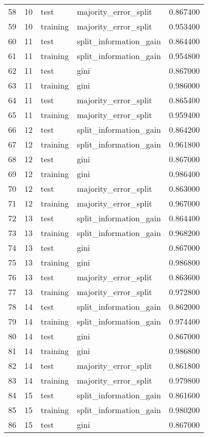 \begin{tabular}{lrllr}
58 & 10 & test & majority_error_split & 0.867400 \\
59 & 10 & training & majority_error_split & 0.953400 \\
60 & 11 & test & split_information_gain & 0.864400 \\
61 & 11 & training & split_information_gain & 0.954800 \\
62 & 11 & test & gini & 0.867000 \\
63 & 11 & training & gini & 0.986000 \\
64 & 11 & test & majority_error_split & 0.865400 \\
65 & 11 & training & majority_error_split & 0.959400 \\
66 & 12 & test & split_information_gain & 0.864200 \\
67 & 12 & training & split_information_gain & 0.961800 \\
68 & 12 & test & gini & 0.867000 \\
69 & 12 & training & gini & 0.986400 \\
70 & 12 & test & majority_error_split & 0.863000 \\
71 & 12 & training & majority_error_split & 0.967000 \\
72 & 13 & test & split_information_gain & 0.864400 \\
73 & 13 & training & split_information_gain & 0.968200 \\
74 & 13 & test & gini & 0.867000 \\
75 & 13 & training & gini & 0.986800 \\
76 & 13 & test & majority_error_split & 0.863600 \\
77 & 13 & training & majority_error_split & 0.972800 \\
78 & 14 & test & split_information_gain & 0.862000 \\
79 & 14 & training & split_information_gain & 0.974400 \\
80 & 14 & test & gini & 0.867000 \\
81 & 14 & training & gini & 0.986800 \\
82 & 14 & test & majority_error_split & 0.861800 \\
83 & 14 & training & majority_error_split & 0.979800 \\
84 & 15 & test & split_information_gain & 0.861600 \\
85 & 15 & training & split_information_gain & 0.980200 \\
86 & 15 & test & gini & 0.867000 \\

\end{tabular}
